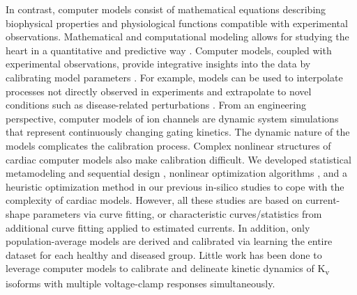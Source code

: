 \documentclass[11pt]{article}
\begin{document}
In contrast, computer models consist of mathematical equations describing biophysical properties and physiological functions compatible with experimental observations. Mathematical and computational modeling allows for studying the heart in a quantitative and predictive way \citep{whittaker2020calibration}. Computer models, coupled with experimental observations, provide integrative insights into the data by calibrating model parameters \citep{winslow2011integrative}. For example, models can be used to interpolate processes not directly observed in experiments and extrapolate to novel conditions such as disease-related perturbations \citep{rodriguez2010systems}. From an engineering perspective, computer models of ion channels are dynamic system simulations that represent continuously changing gating kinetics. The dynamic nature of the models complicates the calibration process. Complex nonlinear structures of cardiac computer models also make calibration difficult. We developed statistical metamodeling and sequential design \citep{du2015statistical}, nonlinear optimization algorithms \citep{du2013silico,du2017silico}, and a heuristic optimization method \citep{kim2022simulation} in our previous in-silico studies to cope with the complexity of cardiac models. However, all these studies are based on current-shape parameters via curve fitting, or characteristic curves/statistics from additional curve fitting applied to estimated currents. In addition, only population-average models are derived and calibrated via learning the entire dataset for each healthy and diseased group. Little work has been done to leverage computer models to calibrate and delineate kinetic dynamics of K\textsubscript{v} isoforms with multiple voltage-clamp responses simultaneously.
\end{document}
